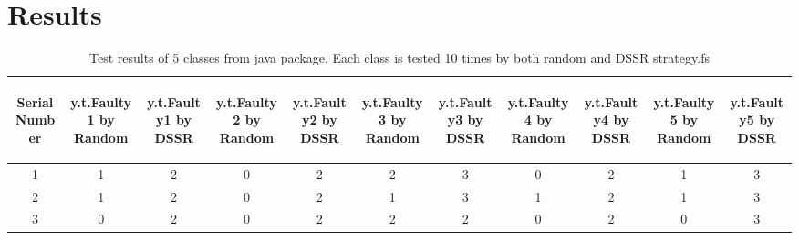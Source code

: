 
\section{Results}


\begin{table}[ht]
\caption{Test results of 5 classes from java package. Each class is tested 10 times by both random and DSSR strategy.fs} %
\centering %
\begin{tabular}{| c | c | c | c | c | c | c | c | c | c | c |} %
\hline\hline %
 \begin{sideways} Serial Number \end{sideways} &  \begin{sideways} y.t.Faulty1 by Random \end{sideways} &  \begin{sideways} y.t.Faulty1 by DSSR \end{sideways} &  \begin{sideways} y.t.Faulty2 by Random \end{sideways} &  \begin{sideways} y.t.Faulty2 by DSSR \end{sideways} & \begin{sideways} y.t.Faulty3 by Random \end{sideways} &  \begin{sideways}y.t.Faulty3 by DSSR \end{sideways} &  \begin{sideways}y.t.Faulty4 by Random \end{sideways} &  \begin{sideways} y.t.Faulty4 by DSSR \end{sideways} &  \begin{sideways} y.t.Faulty5 by Random \end{sideways} &  \begin{sideways} y.t.Faulty5 by DSSR \end{sideways} \\ [1ex] %
\hline  %
1 & 1 & 2 & 0 & 2 & 2 & 3 & 0 & 2 & 1 & 3 \\  %

2 & 1 & 2 & 0 & 2 & 1 & 3 & 1 & 2 & 1 & 3 \\

3 & 0 & 2 & 0 & 2 & 2 & 2 & 0 & 2 & 0 & 3 \\


\end{tabular}
\end{table}
